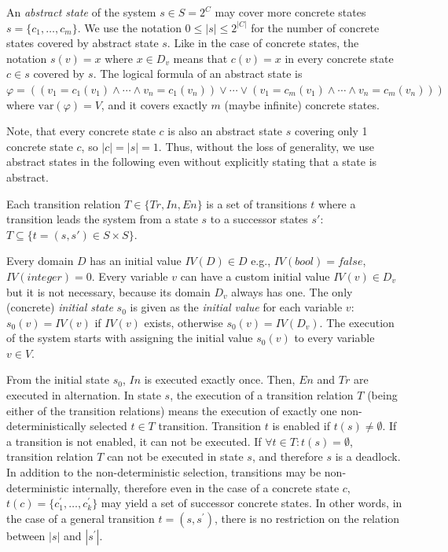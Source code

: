 An \textit{abstract state} of the system $s \in S = 2^C$ may cover more concrete states $s = \{ c_1, \ldots, c_m \}$. We use the notation $0 \leq |s| \leq 2^{|C|}$ for the number of concrete states covered by abstract state $s$. Like in the case of concrete states, the notation $s(v) = x$ where $x \in D_v$ means that $c(v) = x$ in every concrete state $c \in s$ covered by $s$.
The logical formula of an abstract state is $\varphi = ((v_1 = c_1(v_1) \wedge \cdots \wedge v_n = c_1(v_n)) \vee \cdots \vee (v_1 = c_m(v_1) \wedge \cdots \wedge v_n = c_m(v_n)))$ where $\mathrm{var}(\varphi) = V$, and it covers exactly $m$ (maybe infinite) concrete states.

Note, that every concrete state $c$ is also an abstract state $s$ covering only 1 concrete state $c$, so $|c| = |s| = 1$. Thus, without the loss of generality, we use abstract states in the following even without explicitly stating that a state is abstract.

Each transition relation $T \in \{ Tr, In, En \}$ is a set of transitions $t$ where a transition leads the system from a state $s$ to a successor states $s'$: $T \subseteq \{ t=(s, s') \in S \times S \}$.

Every domain $D$ has an initial value $IV(D) \in D$ e.g., $IV(\textit{bool}) = \textit{false}$, $IV(\textit{integer}) = 0$. Every variable $v$ can have a custom initial value $IV(v) \in D_v$ but it is not necessary, because its domain $D_v$ always has one. The only (concrete) \emph{initial state} $s_0$ is given as the \emph{initial value} for each variable $v$: $s_0(v) = IV(v)$ if $IV(v)$ exists, otherwise $s_0(v) = IV(D_v)$. The execution of the system starts with assigning the initial value $s_0(v)$ to every variable $v \in V$.

From the initial state $s_0$, $In$ is executed exactly once. Then, $En$ and $Tr$ are executed in alternation. In state $s$, the execution of a transition relation $T$ (being either of the transition relations) means the execution of exactly one non-deterministically selected $t \in T$ transition. Transition $t$ is enabled if $t(s) \neq \emptyset$. If a transition is not enabled, it can not be executed. If $\forall t \in T: t(s) = \emptyset$, transition relation $T$ can not be executed in state $s$, and therefore $s$ is a deadlock. In addition to the non-deterministic selection, transitions may be non-deterministic internally, therefore even in the case of a concrete state $c$, $t(c) = \{c^\prime_1, \ldots, c^\prime_k\}$ may yield a set of successor concrete states. In other words, in the case of a general transition $t=(s, s^\prime)$, there is no restriction on the relation between $|s|$ and $|s^\prime|$.

